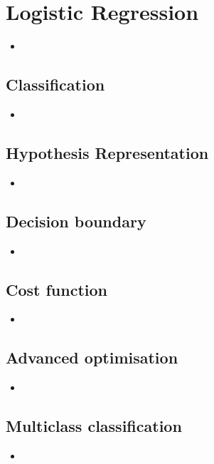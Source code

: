 \documentclass[13pt]{book}
\begin{document}
\chapter{Logistic Regression}
\begin{itemize}
  \item
\end{itemize}

\section{Classification}
\begin{itemize}
  \item
\end{itemize}

\section{Hypothesis Representation}
\begin{itemize}
  \item
\end{itemize}

\section{Decision boundary}
\begin{itemize}
  \item
\end{itemize}

\section{Cost function}
\begin{itemize}
  \item
\end{itemize}

\section{Advanced optimisation}
\begin{itemize}
  \item
\end{itemize}

\section{Multiclass classification}
\begin{itemize}
  \item
\end{itemize}
\end{document}
